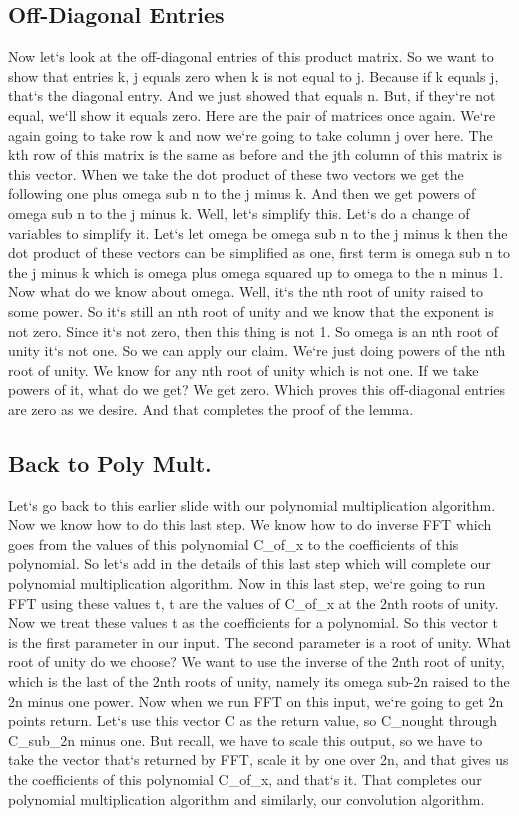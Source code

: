 \subsection{Off-Diagonal Entries}
Now let`s look at the off-diagonal entries of this product matrix.
So we want to show that entries k, j equals zero when k is not equal to j.
Because if k equals j, that`s the diagonal entry.
And we just showed that equals n.
But, if they`re not equal, we`ll show it equals zero.
Here are the pair of matrices once again.
We`re again going to take row k and now we`re going to take column j over here.
The kth row of this matrix is the same as before and the jth column of this matrix is this vector.
When we take the dot product of these two vectors we get the following one plus omega sub n to the j minus k.
And then we get powers of omega sub n to the j minus k.
Well, let`s simplify this.
Let`s do a change of variables to simplify it.
Let`s let omega be omega sub n to the j minus k then the dot product of these vectors can be simplified as one, first term is omega sub n to the j minus k which is omega plus omega squared up to omega to the n minus 1.
Now what do we know about omega.
Well, it`s the nth root of unity raised to some power.
So it`s still an nth root of unity and we know that the exponent is not zero.
Since it`s not zero, then this thing is not 1.
So omega is an nth root of unity it`s not one.
So we can apply our claim.
We`re just doing powers of the nth root of unity.
We know for any nth root of unity which is not one.
If we take powers of it, what do we get? We get zero.
Which proves this off-diagonal entries are zero as we desire.
And that completes the proof of the lemma.

\subsection{Back to Poly Mult.}
Let`s go back to this earlier slide with our polynomial multiplication algorithm.
Now we know how to do this last step.
We know how to do inverse FFT which goes from the values of this polynomial C\_of\_x to the coefficients of this polynomial.
So let`s add in the details of this last step which will complete our polynomial multiplication algorithm.
Now in this last step, we`re going to run FFT using these values t, t are the values of C\_of\_x at the 2nth roots of unity.
Now we treat these values t as the coefficients for a polynomial.
So this vector t is the first parameter in our input.
The second parameter is a root of unity.
What root of unity do we choose? We want to use the inverse of the 2nth root of unity, which is the last of the 2nth roots of unity, namely its omega sub-2n raised to the 2n minus one power.
Now when we run FFT on this input, we`re going to get 2n points return.
Let`s use this vector C as the return value, so C\_nought through C\_sub\_2n minus one.
But recall, we have to scale this output, so we have to take the vector that`s returned by FFT, scale it by one over 2n, and that gives us the coefficients of this polynomial C\_of\_x, and that`s it.
That completes our polynomial multiplication algorithm and similarly, our convolution algorithm.

